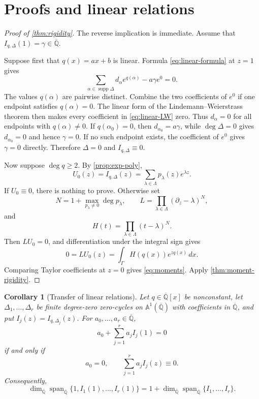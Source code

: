 \documentclass[11pt]{article}
\numberwithin{equation}{section}
\newtheorem{corollary}[corollary]{Corollary}
\theoremstyle{definition}
\theoremstyle{remark}
\newcommand{\Qbar}{\overline{\mathbb Q}}
\newcommand{\Aone}{\mathbb A^1}
\newcommand{\Span}{\operatorname{span}}
\newcommand{\supp}{\operatorname{supp}}
\begin{document}
\section{Proofs and linear relations}

\begin{proof}[Proof of \cref{thm:rigidity}]
The reverse implication is immediate.  Assume that
$I_{q,\Delta}(1)=\gamma\in\Qbar$.

Suppose first that $q(x)=ax+b$ is linear.  Formula
\eqref{eq:linear-formula} at $z=1$ gives
\begin{equation}\label{eq:linear-LW}
  \sum_{\alpha\in\supp\Delta}d_\alpha e^{q(\alpha)}
  -a\gamma e^0=0.
\end{equation}
The values $q(\alpha)$ are pairwise distinct.  Combine the two coefficients
of $e^0$ if one endpoint satisfies $q(\alpha)=0$.  The linear form of the
Lindemann--Weierstrass theorem \cite[Chapter~1]{Baker} then makes every
coefficient in \eqref{eq:linear-LW} zero.  Thus
$d_\alpha=0$ for all endpoints with $q(\alpha)\ne0$.  If
$q(\alpha_0)=0$, then $d_{\alpha_0}=a\gamma$, while
$\deg\Delta=0$ gives $d_{\alpha_0}=0$ and hence $\gamma=0$.  If no such
endpoint exists, the coefficient of $e^0$ gives $\gamma=0$ directly.
Therefore $\Delta=0$ and $I_{q,\Delta}\equiv0$.

Now suppose $\deg q\ge2$.  By \cref{prop:exp-poly},
\[
  U_0(z)=I_{q,\Delta}(z)
  =\sum_{\lambda\in\Lambda}p_\lambda(z)e^{\lambda z}.
\]
If $U_0\equiv0$, there is nothing to prove.  Otherwise set
\[
  N=1+\max_{p_\lambda\ne0}\deg p_\lambda,
  \qquad
  L=\prod_{\lambda\in\Lambda}(\partial_z-\lambda)^N,
\]
and
\[
  H(t)=\prod_{\lambda\in\Lambda}(t-\lambda)^N.
\]
Then $LU_0=0$, and differentiation under the integral sign gives
\[
  0=LU_0(z)
  =\int_\Gamma H(q(x))e^{zq(x)}\,dx.
\]
Comparing Taylor coefficients at $z=0$ gives \eqref{eq:moments}.  Apply
\cref{thm:moment-rigidity}.
\end{proof}

\begin{corollary}[Transfer of linear relations]\label{cor:transfer}
Let $q\in\Qbar[x]$ be nonconstant, let
$\Delta_1,\ldots,\Delta_r$ be finite degree-zero zero-cycles on
$\Aone(\Qbar)$ with coefficients in $\Qbar$, and put
$I_j(z)=I_{q,\Delta_j}(z)$.  For $a_0,\ldots,a_r\in\Qbar$,
\begin{equation}\label{eq:transfer}
  a_0+\sum_{j=1}^r a_jI_j(1)=0
\end{equation}
if and only if
\[
  a_0=0,
  \qquad
  \sum_{j=1}^r a_jI_j(z)\equiv0.
\]
Consequently,
\[
 \dim_{\Qbar}\Span_{\Qbar}\{1,I_1(1),\ldots,I_r(1)\}
 =1+\dim_{\Qbar}\Span_{\Qbar}\{I_1,\ldots,I_r\}.
\]
\end{corollary}
\end{document}
